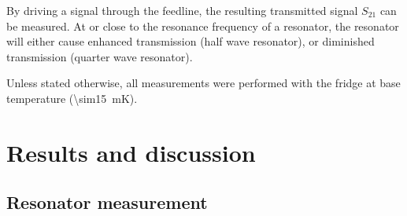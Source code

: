 By driving a signal through the feedline, the resulting transmitted signal $S_{21}$ can be measured. At or close to the resonance frequency of a resonator, the resonator will either cause enhanced transmission (half wave resonator), or diminished transmission (quarter wave resonator).

Unless stated otherwise, all measurements were performed with the fridge at base temperature (\SI{\sim15}{\milli \kelvin}).

\section{Results and discussion}


\subsection{Resonator measurement}

